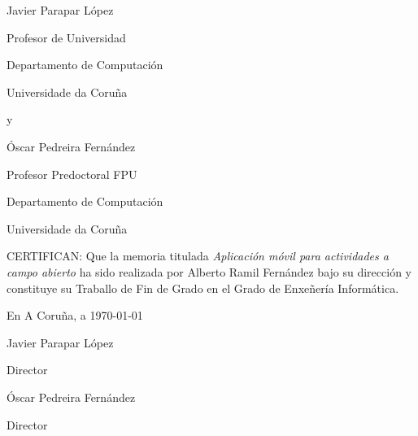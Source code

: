 \documentclass[11pt,a4paper,titlepage,twoside,openright]{report}
\begin{document}
\begin{titlepage}
\pagestyle{empty}

\begin{minipage}[t][4cm][l]{.4\textwidth}
\begin{center}
{\sc Javier Parapar López}

Profesor de Universidad

Departamento de Computación

Universidade da Coruña
\end{center}
\end{minipage}
\begin{minipage}[t][4cm][l]{.1\textwidth}
\begin{center}
\vspace{1.2\baselineskip}
y
\end{center}
\end{minipage}
\begin{minipage}[t][4cm][l]{.4\textwidth}
\begin{center}
{\sc Óscar Pedreira Fernández}

Profesor Predoctoral FPU

Departamento de Computación

Universidade da Coruña
\end{center}
\end{minipage}

\vspace{2cm}

CERTIFICAN:
Que la memoria titulada {\it Aplicación móvil para actividades a campo abierto} ha sido realizada por {\sc Alberto Ramil Fernández} bajo su dirección y constituye su Traballo de Fin de Grado en el Grado de Enxeñería Informática.\\[4pt]
\begin{center}
En A Coruña, a \today
\end{center}

\vspace{3cm}

\begin{minipage}[t][5cm][l]{.45\textwidth}
\begin{center}
{\sc Javier Parapar López}

Director
\end{center}
\end{minipage}
\begin{minipage}[t][5cm][l]{.45\textwidth}
\begin{center}
{\sc Óscar Pedreira Fernández}

Director
\end{center}
\end{minipage}
\end{titlepage}
\cleardoublepage
\end{document}
